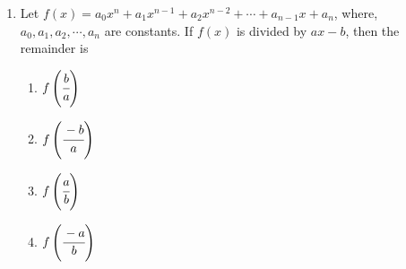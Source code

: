 \begin{multicols}{2}
\begin{enumerate}[label={\arabic*.}]
\item Let $f(x) = a_{0}x^{n} + a_{1}x^{n-1} + a_{2}x^{n-2} + \cdots + a_{n-1}x + a_{n}$, where, $a_{0}, a_{1}, a_{2}, \cdots, a_{n}$ are constants. If $f(x)$ is divided by $ax -b$, then the remainder is
	\begin{enumerate}[label={\Alph*.}]
	\item \(f\left(\cfrac{b}{a}\right)\)
	\item \(f\left(\cfrac{-b}{a}\right)\)
	\item \(f\left(\cfrac{a}{b}\right)\)
	\item \(f\left(\cfrac{-a}{b}\right)\)
	\end{enumerate}
\end{enumerate}
\end{multicols}